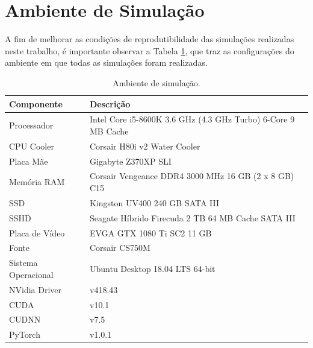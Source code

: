 \section{Ambiente de Simulação}
\label{sec:results_simulation_environment}

A fim de melhorar as condições de reprodutibilidade das simulações realizadas neste trabalho, é importante observar a Tabela \ref{tab:results_pc_specs}, que traz as configurações do ambiente em que todas as simulações foram realizadas.

\begin{table}[H]
    \centering
    \caption{Ambiente de simulação.}
    \begin{tabular}{ll}
        \toprule
        \textbf{Componente} &   \textbf{Descrição}\\
        \midrule
        Processador         &   Intel Core i5-8600K 3.6 GHz (4.3 GHz Turbo) 6-Core 9 MB Cache\\
        \hline
        CPU Cooler          &   Corsair H80i v2 Water Cooler\\
        \hline
        Placa Mãe           &   Gigabyte Z370XP SLI\\
        \hline
        Memória RAM         &   Corsair Vengeance DDR4 3000 MHz 16 GB (2 
        x 8 GB) C15\\
        \hline
        SSD                 &   Kingston UV400 240 GB SATA III\\
        \hline
        SSHD                &   Seagate Híbrido Firecuda 2 TB 64 MB Cache 
        SATA III\\
        \hline
        Placa de Vídeo      &   EVGA GTX 1080 Ti SC2 11 GB\\
        \hline
        Fonte               &   Corsair CS750M\\
        \hline
        Sistema Operacional &   Ubuntu Desktop 18.04 LTS 64-bit\\
        \hline
        NVidia Driver       &   v418.43\\
        \hline
        CUDA                &   v10.1\\
        \hline
        CUDNN               &   v7.5\\
        \hline
        PyTorch             &   v1.0.1\\
        \bottomrule
    \end{tabular}
    \label{tab:results_pc_specs}
\end{table}

